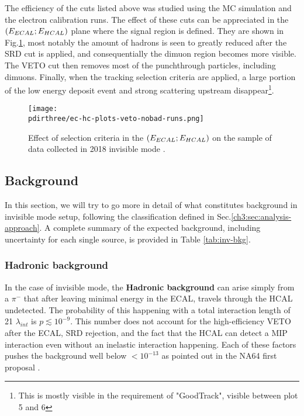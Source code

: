 The efficiency of the cuts listed above was studied using the MC simulation and the electron calibration runs.
The effect of these cuts can be appreciated in the $(E_{ECAL};E_{HCAL})$ plane where the signal region is defined. They are shown in Fig.\ref{fig:inv-cut-ehcal}, most notably the amount of hadrons is seen to greatly reduced after the SRD cut is applied, and consequentially the dimuon region becomes more visible. The VETO cut then removes most of the punchthrough particles, including dimuons. Finally, when the tracking selection criteria are applied, a large portion of the low energy deposit event and strong scattering upstream disappear\footnote{This is mostly visible in the requirement of "GoodTrack", visible between plot 5 and 6}.


\begin{figure}[bth!]
  \centering
   \texttt{[image: \\pdirthree/ec-hc-plots-veto-nobad-runs.png]}
  \caption[effect of the cuts in invisible mode]{Effect of selection criteria in the $(E_{ECAL};E_{HCAL})$ on the sample of data collected in 2018 invisible mode \cite{invis-cut-plot,NA64:2019imj}.}
  \label{fig:inv-cut-ehcal}
\end{figure}

\subsection{Background}
\label{ch3:sec:bkg:inv}

In this section, we will try to go more in detail of what constitutes background in invisible mode setup, following the classification defined in Sec.\ref{ch3:sec:analysis-approach}. A complete summary of the expected background, including uncertainty for each single source, is provided in Table \ref{tab:inv-bkg}.
\subsubsection{Hadronic background}
\label{ch3:sec:bkg:inv:hadr}


In the case of invisible mode, the \textbf{Hadronic background} can arise simply from a $\pi^-$ that after leaving minimal energy in the ECAL, travels through the HCAL undetected. The probability of this happening with a total interaction length of 21 $\lambda_{int}$ is $p\lesssim 10^{-9}$. This number does not account for the high-efficiency VETO after the ECAL, SRD rejection, and the fact that the HCAL can detect a MIP interaction even without an inelastic interaction happening. Each of these factors pushes the background well below $<10^{-13}$ as pointed out in the NA64 first proposal \cite{Andreas:2013lya}.

